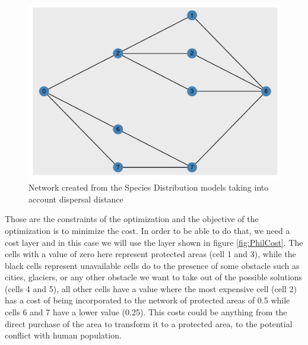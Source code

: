 \documentclass[]{article}
\begin{document}
\begin{figure}
\centering
\includegraphics{TagetBasedNew_files/figure-latex/PhilNet-1.pdf}
\caption{\label{fig:PhilNet}Network created from the Species Distribution models taking into account dispersal distance}
\end{figure}

Those are the constraints of the optimization and the objective of the optimization is to minimize the cost. In order to be able to do that, we need a cost layer and in this case we will use the layer shown in figure \ref{fig:PhilCost}. The cells with a value of zero here represent protected areas (cell 1 and 3), while the black cells represent unavailable cells do to the presence of some obstacle such as cities, glaciers, or any other obstacle we want to take out of the possible solutions (cells 4 and 5), all other cells have a value where the most expensive cell (cell 2) has a cost of being incorporated to the network of protected areas of 0.5 while cells 6 and 7 have a lower value (0.25). This costs could be anything from the direct purchase of the area to transform it to a protected area, to the potential conflict with human population.
\end{document}

